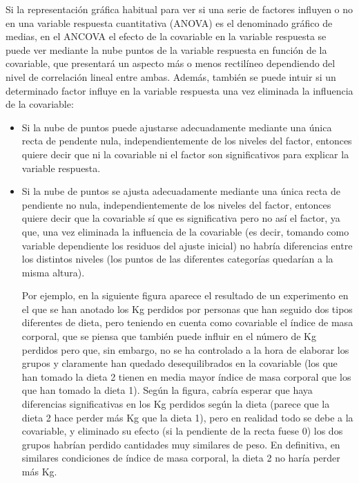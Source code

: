 \documentclass[
  spanish,
  a4paper,
]{scrreport}
\theoremstyle{plain}
\theoremstyle{definition}
\theoremstyle{definition}
\theoremstyle{remark}
\begin{document}
Si la representación gráfica habitual para ver si una serie de factores
influyen o no en una variable respuesta cuantitativa (ANOVA) es el
denominado gráfico de medias, en el ANCOVA el efecto de la covariable en
la variable respuesta se puede ver mediante la nube puntos de la
variable respuesta en función de la covariable, que presentará un
aspecto más o menos rectilíneo dependiendo del nivel de correlación
lineal entre ambas. Además, también se puede intuir si un determinado
factor influye en la variable respuesta una vez eliminada la influencia
de la covariable:

\begin{itemize}
\item
  Si la nube de puntos puede ajustarse adecuadamente mediante una única
  recta de pendente nula, independientemente de los niveles del factor,
  entonces quiere decir que ni la covariable ni el factor son
  significativos para explicar la variable respuesta.
\item
  Si la nube de puntos se ajusta adecuadamente mediante una única recta
  de pendiente no nula, independientemente de los niveles del factor,
  entonces quiere decir que la covariable sí que es significativa pero
  no así el factor, ya que, una vez eliminada la influencia de la
  covariable (es decir, tomando como variable dependiente los residuos
  del ajuste inicial) no habría diferencias entre los distintos niveles
  (los puntos de las diferentes categorías quedarían a la misma altura).

  Por ejemplo, en la siguiente figura aparece el resultado de un
  experimento en el que se han anotado los Kg perdidos por personas que
  han seguido dos tipos diferentes de dieta, pero teniendo en cuenta
  como covariable el índice de masa corporal, que se piensa que también
  puede influir en el número de Kg perdidos pero que, sin embargo, no se
  ha controlado a la hora de elaborar los grupos y claramente han
  quedado desequilibrados en la covariable (los que han tomado la dieta
  2 tienen en media mayor índice de masa corporal que los que han tomado
  la dieta 1). Según la figura, cabría esperar que haya diferencias
  significativas en los Kg perdidos según la dieta (parece que la dieta
  2 hace perder más Kg que la dieta 1), pero en realidad todo se debe a
  la covariable, y eliminado su efecto (si la pendiente de la recta
  fuese 0) los dos grupos habrían perdido cantidades muy similares de
  peso. En definitiva, en similares condiciones de índice de masa
  corporal, la dieta 2 no haría perder más Kg.


\end{itemize}
\end{document}
